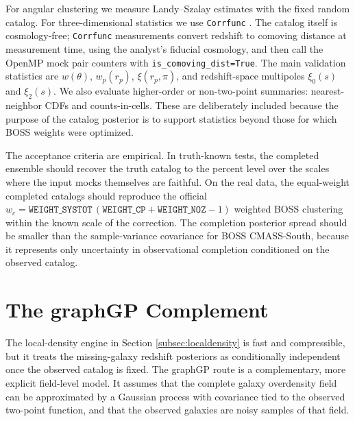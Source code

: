 \documentclass[apj]{emulateapj}
\begin{document}
For angular clustering we measure Landy--Szalay estimates
\citep{LandySzalay1993} with the fixed random catalog.  For three-dimensional
statistics we use \texttt{Corrfunc} \citep{Corrfunc2020}.  The catalog itself is
cosmology-free; \texttt{Corrfunc} measurements convert redshift to comoving
distance at measurement time, using the analyst's fiducial cosmology, and then
call the OpenMP mock pair counters with \texttt{is\_comoving\_dist=True}.  The
main validation statistics are $w(\theta)$, $w_p(r_p)$, $\xi(r_p,\pi)$, and
redshift-space multipoles $\xi_0(s)$ and $\xi_2(s)$.  We also evaluate
higher-order or non-two-point summaries: nearest-neighbor CDFs and
counts-in-cells.  These are deliberately included because the purpose of the
catalog posterior is to support statistics beyond those for which BOSS weights
were optimized.

The acceptance criteria are empirical.  In truth-known tests, the completed
ensemble should recover the truth catalog to the percent level over the scales
where the input mocks themselves are faithful.  On the real data, the
equal-weight completed catalogs should reproduce the official
$w_c=\texttt{WEIGHT\_SYSTOT}\,(\texttt{WEIGHT\_CP}+\texttt{WEIGHT\_NOZ}-1)$
weighted BOSS clustering within the known scale of the correction.  The
completion posterior spread should be smaller than the sample-variance
covariance for BOSS CMASS-South, because it represents only uncertainty in
observational completion conditioned on the observed catalog.

\section{The graphGP Complement}
\label{sec:graphgp}

The local-density engine in Section \ref{subsec:localdensity} is fast and
compressible, but it treats the missing-galaxy redshift posteriors as
conditionally independent once the observed catalog is fixed.  The graphGP
route is a complementary, more explicit field-level model.  It assumes that the
complete galaxy overdensity field can be approximated by a Gaussian process
with covariance tied to the observed two-point function, and that the observed
galaxies are noisy samples of that field.
\end{document}
